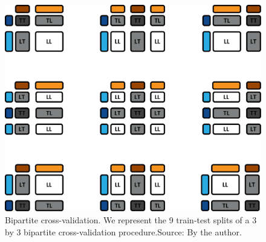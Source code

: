 \begin{figure}[tb]
    \centering
    \includegraphics[width=\textwidth]{figures/cv.pdf}
    \caption{Bipartite cross-validation. We represent the 9 train-test splits of a 3 by 3 bipartite cross-validation procedure.\newline Source: By the author.}
    \label{fig:bipartite cv}
\end{figure}




